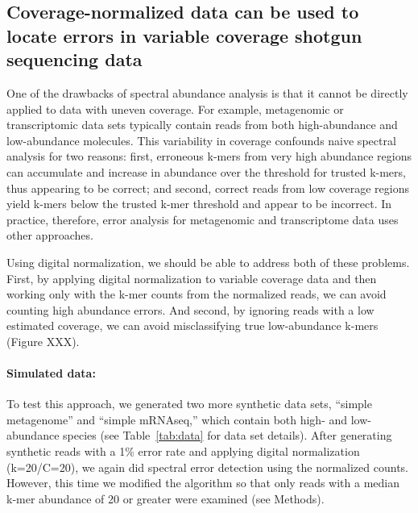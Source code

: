 \documentclass{article}
\begin{document}
%

\subsection{Coverage-normalized data can be used to locate errors in variable
coverage shotgun sequencing data}

One of the drawbacks of spectral abundance analysis is that it cannot
be directly applied to data with uneven coverage.  For example,
metagenomic or transcriptomic data sets typically contain reads from
both high-abundance and low-abundance molecules.  This variability in
coverage confounds naive spectral analysis for two reasons: first,
erroneous k-mers from very high abundance regions can accumulate and
increase in abundance over the threshold for trusted k-mers, thus
appearing to be correct; and second, correct reads from low coverage
regions yield k-mers below the trusted k-mer threshold and appear to
be incorrect.  In practice, therefore, error analysis for
metagenomic and transcriptome data uses other approaches.

Using digital normalization, we should be able to address both of these
problems.  First, by applying digital normalization to variable
coverage data and then working only with the k-mer counts from the
normalized reads, we can avoid counting high abundance errors.
And second, by ignoring reads with a low estimated coverage, we can
avoid misclassifying true low-abundance k-mers (Figure XXX).



\paragraph{Simulated data:}
To test this approach, we generated two more synthetic data sets,
``simple metagenome'' and ``simple mRNAseq,'' which contain both high-
and low-abundance species (see Table~\ref{tab:data} for data set
details).  After generating synthetic reads with a 1\% error rate and
applying digital normalization (k=20/C=20), we again did spectral
error detection using the normalized counts.  However, this time we
modified the algorithm so that only reads with a median k-mer
abundance of 20 or greater were examined (see Methods).
\end{document}
